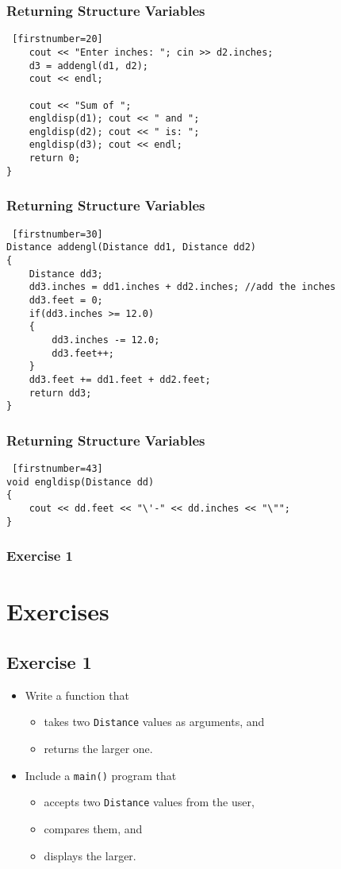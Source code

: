 \documentclass{beamer}
\begin{document}
\begin{frame} [fragile]
    \frametitle{Returning Structure Variables}
    \lstset{style=mystyle}
\begin{lstlisting} [firstnumber=20]
    cout << "Enter inches: "; cin >> d2.inches;
    d3 = addengl(d1, d2);
    cout << endl;

    cout << "Sum of ";
    engldisp(d1); cout << " and ";
    engldisp(d2); cout << " is: ";
    engldisp(d3); cout << endl;
    return 0;
}
\end{lstlisting}
\end{frame}

\begin{frame} [fragile]
    \frametitle{Returning Structure Variables}
    \lstset{style=mystyle}
\begin{lstlisting} [firstnumber=30]
Distance addengl(Distance dd1, Distance dd2)
{
    Distance dd3;
    dd3.inches = dd1.inches + dd2.inches; //add the inches
    dd3.feet = 0;
    if(dd3.inches >= 12.0)
    {
        dd3.inches -= 12.0;
        dd3.feet++;
    }
    dd3.feet += dd1.feet + dd2.feet;
    return dd3;
}
\end{lstlisting}
\end{frame}

\begin{frame} [fragile]
    \frametitle{Returning Structure Variables}
    \lstset{style=mystyle}
\begin{lstlisting} [firstnumber=43]
void engldisp(Distance dd)
{
    cout << dd.feet << "\'-" << dd.inches << "\"";
}
\end{lstlisting}
\end{frame}

\begin{frame}
    \frametitle{Exercise 1}
    \section{Exercises} %
    \label{sec:exercises}
    \subsection{Exercise 1} %
    \label{sub:exercise_1}
    \begin{itemize}
        \item Write a function that
        \begin{itemize}
            \item takes two \texttt{Distance} values as arguments, and
            \item returns the larger one.
        \end{itemize}
        \item Include a \texttt{main()} program that
        \begin{itemize}
            \item accepts two \texttt{Distance} values from the user,
            \item compares them, and
            \item displays the larger.
        \end{itemize}
    \end{itemize}
\end{frame}
\end{document}
